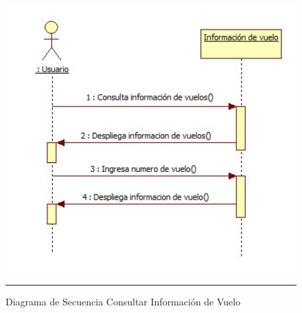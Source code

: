 \begin{figure}[H]
	\centering
		\includegraphics[width=1\textwidth]{Figuras/Infovuelo.jpg}
		\rule{30em}{0.5pt}
	\caption[Diagrama de Secuencia Consultar Información de Vuelo]{Diagrama de Secuencia Consultar Información de Vuelo}
	\label{fig:secConsultarInformacionVuelo}
\end{figure}